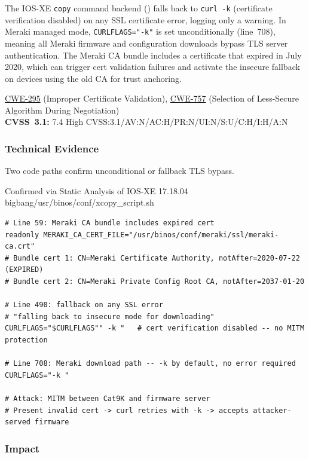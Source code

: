 \documentclass[11pt,a4paper]{article}
\begin{document}
\begin{overviewbox}
The IOS-XE \texttt{copy} command backend () falls back to
\texttt{curl -k} (certificate verification disabled) on any SSL certificate error, logging
only a warning. In Meraki managed mode, \texttt{CURLFLAGS="-k"} is set unconditionally
(line~708), meaning all Meraki firmware and configuration downloads bypass TLS server
authentication. The Meraki CA bundle includes a certificate that expired in July 2020,
which can trigger cert validation failures and activate the insecure fallback on devices
using the old CA for trust anchoring.

\href{https://cwe.mitre.org/data/definitions/295.html}{CWE-295} (Improper Certificate Validation),
\href{https://cwe.mitre.org/data/definitions/757.html}{CWE-757} (Selection of Less-Secure Algorithm During Negotiation)\\
\textbf{CVSS~3.1:} 7.4 High \quad CVSS:3.1/AV:N/AC:H/PR:N/UI:N/S:U/C:H/I:H/A:N
\end{overviewbox}

\subsubsection{Technical Evidence}

Two code paths confirm unconditional or fallback TLS bypass.

\begin{pocbox}{Confirmed via Static Analysis of IOS-XE 17.18.04 bigbang/usr/binos/conf/xcopy\_script.sh}
\begin{lstlisting}[style=bash]
# Line 59: Meraki CA bundle includes expired cert
readonly MERAKI_CA_CERT_FILE="/usr/binos/conf/meraki/ssl/meraki-ca.crt"
# Bundle cert 1: CN=Meraki Certificate Authority, notAfter=2020-07-22 (EXPIRED)
# Bundle cert 2: CN=Meraki Private Config Root CA, notAfter=2037-01-20

# Line 490: fallback on any SSL error
# "falling back to insecure mode for downloading"
CURLFLAGS="$CURLFLAGS"" -k "   # cert verification disabled -- no MITM protection

# Line 708: Meraki download path -- -k by default, no error required
CURLFLAGS="-k "

# Attack: MITM between Cat9K and firmware server
# Present invalid cert -> curl retries with -k -> accepts attacker-served firmware
\end{lstlisting}
\end{pocbox}

\subsubsection{Impact}
\end{document}
